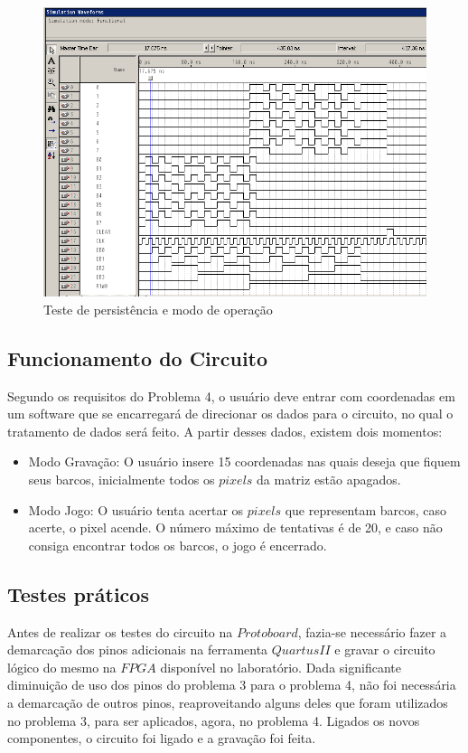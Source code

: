 \documentclass[12pt]{article}
\begin{document}
\begin{figure}[h]
\centering
\includegraphics[width=1\textwidth]{img/testram2.png}
\caption{Teste de persistência e modo de operação}
\label{fig:ramtest2}
\end{figure}

\subsection{Funcionamento do Circuito}
Segundo os requisitos do Problema 4, o usuário deve entrar com coordenadas em um software que se encarregará de direcionar os dados para o circuito, no qual o tratamento de dados será feito. A partir desses dados, existem dois momentos:

\begin{itemize}
\item Modo Gravação: O usuário insere 15 coordenadas nas quais deseja que fiquem seus barcos, inicialmente todos os $pixels$ da matriz estão apagados.
\item Modo Jogo: O usuário tenta acertar os $pixels$ que representam barcos, caso acerte, o pixel acende. O número máximo de tentativas é de 20, e caso não consiga encontrar todos os barcos, o jogo é encerrado.
\end{itemize}


\subsection{Testes práticos}
Antes de realizar os testes do circuito na $Protoboard$, fazia-se necessário fazer a demarcação dos pinos adicionais na ferramenta $Quartus II$ e  gravar o circuito lógico do mesmo na $FPGA$ disponível no laboratório. Dada significante diminuição de uso dos pinos do problema 3 para o problema 4, não foi necessária a demarcação  de outros pinos, reaproveitando alguns deles que foram utilizados no problema 3, para ser aplicados, agora, no problema 4. Ligados os novos componentes, o circuito foi ligado e a gravação foi feita.
\end{document}
